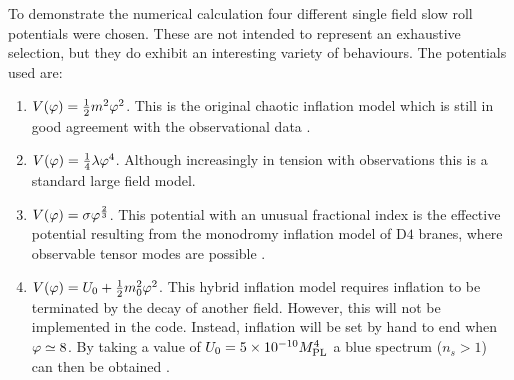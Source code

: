 To demonstrate the numerical calculation four different single field slow roll
potentials were chosen. These are not intended to represent an exhaustive selection,
but they do exhibit an interesting variety of behaviours. The potentials used are:
% 
% 
\begin{enumerate}
% 
 \item $V(\varphi) = \frac{1}{2} m^2 \varphi^2$. This is the original chaotic inflation model which is
still in good agreement with the observational data \cite{Alabidi:2008ej}.
% 
 \item $V(\varphi) = \frac{1}{4}\lambda\varphi^4$. Although increasingly in tension with observations
 this is a standard large field model.
% 
 \item $V(\varphi) = \sigma\varphi^{\frac{2}{3}}$. This potential with an unusual fractional index
is the effective potential resulting from the monodromy inflation model of D$4$
branes, where observable tensor modes are possible \cite{Silverstein:2008sg,
Alabidi:2008ej}.
% 
 \item $V(\varphi) = U_0 + \frac{1}{2} m_0^2 \varphi^2$. This hybrid inflation model requires inflation to
be terminated by the decay of another field. However, this will not be
implemented in the code. Instead,
inflation will be set by hand to end when $\varphi \simeq 8$. By taking a value of
$U_0 = 5\times 10^{-10}M_{\mathrm{PL}}^{4}$ a blue spectrum ($n_s>1$) can then be obtained
\cite{Linde:1993cn,Komatsu:2008hk}.
% 
\end{enumerate}
% 
% 
